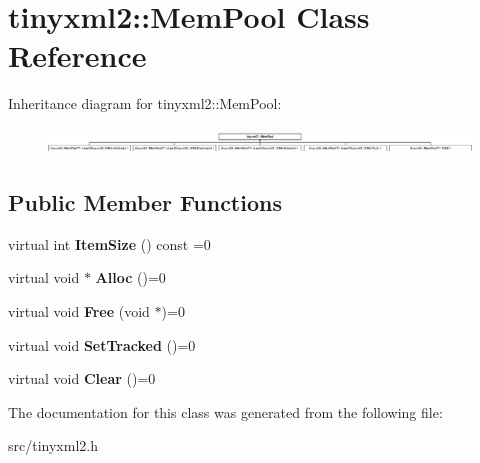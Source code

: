 \hypertarget{classtinyxml2_1_1_mem_pool}{}\section{tinyxml2\+:\+:Mem\+Pool Class Reference}
\label{classtinyxml2_1_1_mem_pool}
Inheritance diagram for tinyxml2\+:\+:Mem\+Pool\+:\begin{figure}[H]
\begin{center}
\leavevmode
\includegraphics[height=0.691358cm]{classtinyxml2_1_1_mem_pool}
\end{center}
\end{figure}
\subsection*{Public Member Functions}
\begin{DoxyCompactItemize}
\item 
virtual int {\bfseries Item\+Size} () const  =0\hypertarget{classtinyxml2_1_1_mem_pool_afb3d8c6cbe91b44f90043d0d94dc7306}{}\label{classtinyxml2_1_1_mem_pool_afb3d8c6cbe91b44f90043d0d94dc7306}

\item 
virtual void $\ast$ {\bfseries Alloc} ()=0\hypertarget{classtinyxml2_1_1_mem_pool_a4f977b5fed752c0bbfe5295f469d6449}{}\label{classtinyxml2_1_1_mem_pool_a4f977b5fed752c0bbfe5295f469d6449}

\item 
virtual void {\bfseries Free} (void $\ast$)=0\hypertarget{classtinyxml2_1_1_mem_pool_a49e3bfac2cba2ebd6776b31e571f64f7}{}\label{classtinyxml2_1_1_mem_pool_a49e3bfac2cba2ebd6776b31e571f64f7}

\item 
virtual void {\bfseries Set\+Tracked} ()=0\hypertarget{classtinyxml2_1_1_mem_pool_ac5804dd1387b2e4de5eef710076a0db1}{}\label{classtinyxml2_1_1_mem_pool_ac5804dd1387b2e4de5eef710076a0db1}

\item 
virtual void {\bfseries Clear} ()=0\hypertarget{classtinyxml2_1_1_mem_pool_a74fcdef9756917c8ae19fbbb4d658ed7}{}\label{classtinyxml2_1_1_mem_pool_a74fcdef9756917c8ae19fbbb4d658ed7}

\end{DoxyCompactItemize}


The documentation for this class was generated from the following file\+:\begin{DoxyCompactItemize}
\item 
src/tinyxml2.\+h\end{DoxyCompactItemize}
